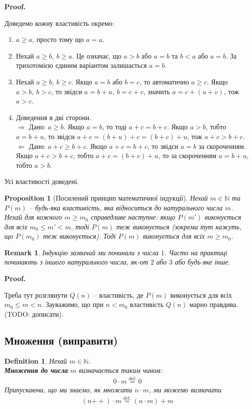 \documentclass[a4paper, 14pt]{extarticle}
\makeatletter
\def\rightproof{$\boxed{\Rightarrow}$ }
\def\leftproof{$\boxed{\Leftarrow}$ }
\theoremstyle{theoremdd}
\theoremstyle{theoremdd}
\newtheorem{definition}[theorem]{Definition}
\theoremstyle{theoremdd}
\theoremstyle{theoremdd}
\theoremstyle{theoremdd}
\theoremstyle{theoremdd}
\theoremstyle{theoremdd}
\theoremstyle{theoremdd}
\theoremstyle{theoremdd}
\theoremstyle{theoremdd}
\newtheorem{proposition}[theorem]{Proposition}
\theoremstyle{theoremdd}
\theoremstyle{theoremdd}
\newtheorem{remark}[theorem]{Remark}
\theoremstyle{theoremdd}
\theoremstyle{theoremdd}
\theoremstyle{theoremdd}
\theoremstyle{theoremdd}
\renewenvironment{proof}[1][Proof.\\]{\par
\pushQED{\hfill \qed}%
\normalfont \topsep6\p@\@plus6\p@\relax
\trivlist
\item\relax
{\bfseries
#1\@addpunct{.}}\hspace\labelsep\ignorespaces
}{%
\popQED\endtrivlist\@endpefalse
}
\newcommand{\plusplus}{\!\!\mathrel{++}}
\makeatother
\begin{document}
\begin{proof}
Доведемо кожну властивість окремо:
\begin{enumerate}[nosep,wide=0pt,label={\arabic*)}]
\item $a \geq a$, просто тому що $a = a$.
\item Нехай $a \geq b,\ b \geq a$. Це означає, що $a > b$ або $a = b$ та $b < a$ або $a = b$. За трихотомією єдиним варіантом залишається $a = b$. 
\item Нехай $a \geq b,\ b \geq c$. Якщо $a = b$ або $b = c$, то автоматично $a \geq c$. Якщо $a > b,\ b > c$, то звідси $a = b + u,\ b = c + v$, значить $a = c + (u+v)$, тож $a > c$.
\item Доведення в дві сторони.\\
\rightproof Дано: $a \geq b$. Якщо $a = b$, то тоді $a+c=b+c$. Якщо $a > b$, тобто $a = b + u$, то звідси $a+c= (b+u)+c = (b+c)+u$, тож $a+c>b+c$.\\
\leftproof Дано: $a+c \geq b+c$. Якщо $a+c = b+c$, то звідси $a = b$ за скороченням. Якщо $a+c > b+c$, тобто $a+c = (b+c) + u$, то за скороченням $a = b+u$, тобто $a > b$.
\end{enumerate}
Усі властивості доведені.
\end{proof}

\begin{proposition}[Посилений принцип математичної індукції]
Нехай $m \in \mathbb{N}$ та $P(m)$ -- будь-яка властивість, яка відноситься до натурального числа $m$. Нехай для кожного $m \geq m_0$ справедливе наступне: якщо $P(m')$ виконується для всіх $m_0 \leq m' < m$, тоді $P(m)$ теж виконується (зокрема тут кажуть, що $P(m_0)$ теж виконується). Тоді $P(m)$ виконується для всіх $m \geq m_0$. 
\end{proposition}

\begin{remark}
Індукцію зазвичай ми починали з числа $1$. Часто на практиці починають з іншого натурального числа, як-от $2$ або $3$ або будь-яке інше.
\end{remark}

\begin{proof}
Треба тут розглянути $Q(n)$ -- властивість, де $P(m)$ виконується для всіх $m_0 \leq m < n$. Зауважимо, що при $n < m_0$ властивість $Q(n)$ марно правдива. (TODO: дописати).
\end{proof}

\subsection{Множення (виправити)}
\begin{definition}
Нехай $m \in \mathbb{N}$.\\
\textbf{Множення до числа} $m$ визначається таким чином:
\begin{align*}
0 \cdot m \overset{\text{def.}}{=} 0
\end{align*}
Припускаючи, що ми знаємо, як множити $n \cdot m$, ми можемо визначити
\begin{align*}
(n \plusplus) \cdot m \overset{\text{def.}}{=} (n \cdot m) + m
\end{align*}
\end{definition}
\end{document}
